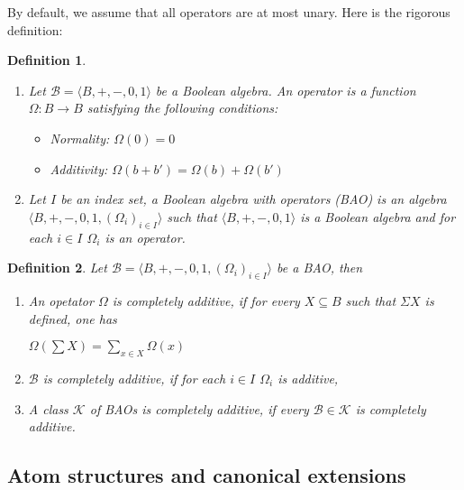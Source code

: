 \documentclass[a4paper]{article}
\theoremstyle{defin}
\newtheorem{defin}{Definition}
\theoremstyle{theorem}
\theoremstyle{prop}
\theoremstyle{lemma}
\theoremstyle{fact}
\theoremstyle{ex}
\theoremstyle{col}
\begin{document}
By default, we assume that all operators are at most unary. Here is the rigorous definition:

\begin{defin}

$ $

  \begin{enumerate}
    \item Let $\mathcal{B} = \langle B, +, -, 0, 1 \rangle$ be a Boolean algebra. An operator is a function $\Omega : B \to B$ satisfying the following conditions:
    \begin{itemize}
      \item Normality: $\Omega(0) = 0$
      \item Additivity: $\Omega(b + b') = \Omega(b) + \Omega(b')$
    \end{itemize}
    \item Let $I$ be an index set, a Boolean algebra with operators (BAO) is an algebra $\langle B, +, -, 0, 1, (\Omega_{i})_{i \in I} \rangle$ such that $\langle B, +, -, 0, 1 \rangle$ is a Boolean algebra and for each $i \in I$ $\Omega_{i}$ is an operator.
  \end{enumerate}
\end{defin}

\begin{defin} Let $\mathcal{B} = \langle B, +, -, 0, 1, (\Omega_{i})_{i \in I} \rangle$ be a BAO, then

  \begin{enumerate}
    \item An opetator $\Omega$ is completely additive, if for every $X \subseteq B$ such that $\Sigma X$ is defined, one has

    \begin{center}
      $\Omega(\sum X) = \sum \limits_{x \in X} \Omega(x)$
    \end{center}
    \item $\mathcal{B}$ is completely additive, if for each $i \in I$ $\Omega_{i}$ is additive,
    \item A class $\mathcal{K}$ of BAOs is completely additive, if every $\mathcal{B} \in \mathcal{K}$ is completely additive.
  \end{enumerate}
\end{defin}

\subsection{Atom structures and canonical extensions}
\end{document}

